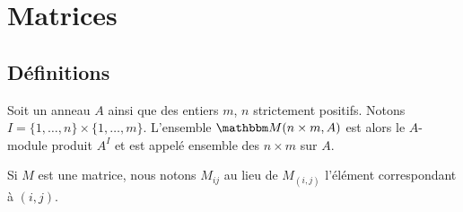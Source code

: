 
\section{Matrices}



\subsection{Définitions}

\begin{definition}
    Soit un anneau \( A\) ainsi que des entiers \( m\), \( n\) strictement positifs. Notons \( I = \{ 1,\ldots, n \}\times \{ 1,\ldots, m \} \). L'ensemble \( \eM(n\times m, A)\) est alors le \( A \)-module produit \( A^I \) et est appelé ensemble des  \(n\times m\) sur \( A \).
\end{definition}
Si \( M\) est une matrice, nous notons \( M_{ij}\) au lieu de \( M_{(i,j)}\) l'élément correspondant à \( (i,j)\).



